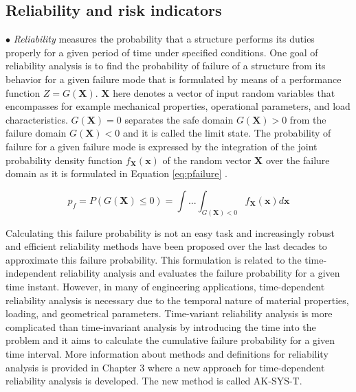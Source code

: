 \subsection{Reliability and risk indicators}
\label{sec:riliabilityandrisk}
\noindent
$\bullet$ \textit{Reliability} measures the probability that a structure performs its duties properly for a given period of time under specified conditions. One goal of reliability analysis is to
find the probability of failure of a structure from its behavior for a given failure mode that is formulated by means of a performance function $Z = G(\textbf{X})$. $\textbf{X}$ here denotes
a vector of input random variables that encompasses for example mechanical properties, operational parameters, and load characteristics. $G(\textbf{X})=0$ separates the safe domain 
$G(\textbf{X})>0$ from the failure domain $G(\textbf{X})<0$ and it is called the limit state. The probability of failure for a given failure mode is  
expressed by the integration of the joint probability density function $f_{\textbf{X}}(\textbf{x})$ of the random vector $\textbf{X}$ over the failure domain as it is formulated in Equation 
\ref{eq:pfailure} \citep{Huang2017, Barron2007}. 

\begin{equation}
 p_f = P(G(\textbf{X})\leq 0) = \int ... \int_{G(\textbf{X})<0}f_{\textbf{X}}(\textbf{x})d\textbf{x}
 \label{eq:pfailure}
\end{equation}

\noindent
Calculating this failure probability is not an easy task and increasingly robust and efficient reliability methods have been proposed over the last decades to approximate 
this failure probability. This formulation is related to the time-independent reliability analysis and evaluates the failure probability for a given time instant. However, in many of
engineering applications, time-dependent reliability analysis is necessary due to the temporal nature of material properties, loading, and geometrical parameters. Time-variant reliability 
analysis is more complicated than time-invariant analysis by introducing the time into the problem and it aims to calculate the cumulative failure probability for a given time interval. 
More information about methods and definitions for reliability analysis is provided in Chapter 3 where a new approach for time-dependent reliability analysis is developed. The new method
is called AK-SYS-T. 



